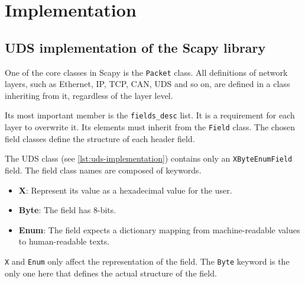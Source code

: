 \chapter{Implementation}

\section{UDS implementation of the Scapy library}

One of the core classes in Scapy is the \texttt{Packet} class. All definitions of network layers, such as Ethernet, IP, TCP, CAN, UDS and so on, are defined in a class inheriting from it, regardless of the layer level.

Its most important member is the \texttt{fields_desc} list. It is a requirement for each layer to overwrite it. Its elements must inherit from the \texttt{Field} class. The chosen field classes define the structure of each header field.


The UDS class (see \autoref{lst:uds-implementation}) contains only an \texttt{XByteEnumField} field. The field class names are composed of keywords.
\begin{itemize}
    \item \textbf{X}: Represent its value as a hexadecimal value for the user.
    \item \textbf{Byte}: The field has 8-bits.
    \item \textbf{Enum}: The field expects a dictionary mapping from machine-readable values to human-readable texts.
\end{itemize}

\texttt{X} and \texttt{Enum} only affect the representation of the field. The \texttt{Byte} keyword is the only one here that defines the actual structure of the field.

